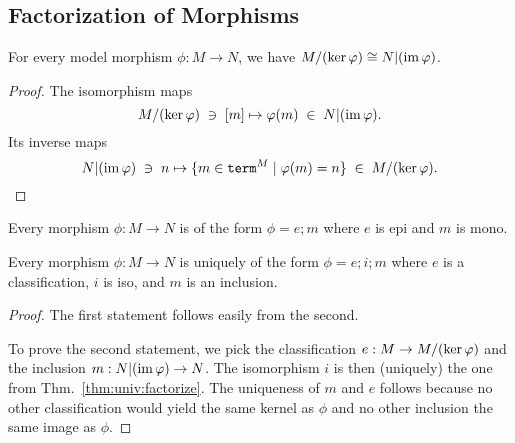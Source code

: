 \subsection{Factorization of Morphisms}

\begin{theorem}\label{thm:univ:factorize}
For every model morphism $\phi:M\to N$, we have $M/(\mathrm{ker}\, \varphi)\cong N|(\mathrm{im}\, \varphi)$.
\end{theorem}
\begin{proof}
The isomorphism maps \[M/(\mathrm{ker}\, \varphi) \;\ni\;[m] \mapsto \varphi(m) \;\in\;  N|(\mathrm{im}\, \varphi).\]
Its inverse maps \[N|(\mathrm{im}\, \varphi)\;\ni\; n \mapsto \{m\in\mathtt{term}^M\;|\;\varphi(m)=n\}\;\in\; M/(\mathrm{ker}\, \varphi).\]
\end{proof}

\begin{theorem}\label{thm:univ:factorize2}
Every morphism $\phi:M\to N$ is of the form $\phi=e;m$ where $e$ is epi and $m$ is mono.

Every morphism $\phi:M\to N$ is uniquely of the form $\phi=e;i;m$ where $e$ is a classification, $i$ is iso, and $m$ is an inclusion.
\end{theorem}
\begin{proof}
The first statement follows easily from the second.

To prove the second statement, we pick the classification $e:M\to M/(\mathrm{ker}\, \varphi)$ and the inclusion $m:N|(\mathrm{im}\, \varphi)\to N$.
The isomorphism $i$ is then (uniquely) the one from Thm.~\ref{thm:univ:factorize}.
The uniqueness of $m$ and $e$ follows because no other classification would yield the same kernel as $\phi$ and no other inclusion the same image as $\phi$.
\end{proof}